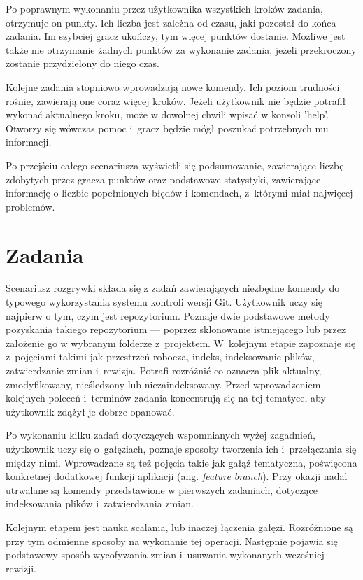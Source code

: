 \documentclass[11pt,a4paper,polish,thesis]{dcsbook}
\begin{document}
	Po poprawnym wykonaniu przez użytkownika wszystkich kroków zadania, otrzymuje on punkty. Ich liczba jest zależna od czasu, jaki pozostał do końca zadania. Im szybciej gracz ukończy, tym więcej punktów dostanie. Możliwe jest także nie otrzymanie żadnych punktów za wykonanie zadania, jeżeli przekroczony zostanie przydzielony do niego czas. 
	
	Kolejne zadania stopniowo wprowadzają nowe komendy. Ich poziom trudności rośnie, zawierają one coraz więcej kroków. Jeżeli użytkownik nie będzie potrafił wykonać aktualnego kroku, może w dowolnej chwili wpisać w konsoli 'help'. Otworzy się wówczas pomoc i~gracz będzie mógł poszukać potrzebnych mu informacji. 
	
	Po przejściu całego scenariusza wyświetli się podsumowanie, zawierające liczbę zdobytych przez gracza punktów oraz podstawowe statystyki, zawierające informację o liczbie popełnionych błędów i komendach, z~którymi miał najwięcej problemów. 
	
	\section{Zadania}
	
	Scenariusz rozgrywki składa się z zadań zawierających niezbędne komendy do typowego wykorzystania systemu kontroli wersji Git. Użytkownik uczy się najpierw o tym, czym jest repozytorium. Poznaje dwie podstawowe metody pozyskania takiego repozytorium --- poprzez sklonowanie istniejącego lub przez założenie go w wybranym folderze z~projektem. W~kolejnym etapie zapoznaje się z~pojęciami takimi jak przestrzeń robocza, indeks, indeksowanie plików, zatwierdzanie zmian i~rewizja. Potrafi rozróżnić co oznacza plik aktualny, zmodyfikowany, nieśledzony lub niezaindeksowany. Przed wprowadzeniem kolejnych poleceń i~terminów zadania koncentrują się na tej tematyce, aby użytkownik zdążył je dobrze opanować. 
	
	Po wykonaniu kilku zadań dotyczących wspomnianych wyżej zagadnień, użytkownik uczy się o~gałęziach, poznaje sposoby tworzenia ich i~przełączania się między nimi. Wprowadzane są też pojęcia takie jak gałąź tematyczna, poświęcona konkretnej dodatkowej funkcji aplikacji (ang. \textit{feature branch}). Przy okazji nadal utrwalane są komendy przedstawione w pierwszych zadaniach, dotyczące indeksowania plików i~zatwierdzania zmian. 

	Kolejnym etapem jest nauka scalania, lub inaczej łączenia gałęzi. Rozróżnione są przy tym odmienne sposoby na wykonanie tej operacji. Następnie pojawia się podstawowy sposób wycofywania zmian i~usuwania wykonanych wcześniej rewizji. 
	
\end{document}
